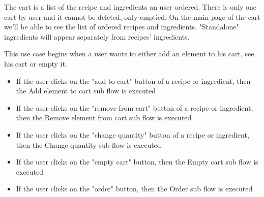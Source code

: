 {
  The cart is a list of the recipe and ingredients an user ordered. There is only one cart by user and it cannot be deleted, only emptied. On the main page of the cart we'll be able to see the list of ordered recipes and ingredients. "Standalone" ingredients will appear separately from recipes' ingredients.

}
{
  This use case begins when a user wants to either add an element to his cart, see his cart or empty it.

  \begin{itemize}
    \item If the user clicks on the "add to cart" button of a recipe or ingredient, then the Add element to cart sub flow is executed
    \item If the user clicks on the "remove from cart" button of a recipe or ingredient, then the Remove element from cart sub flow is executed
    \item If the user clicks on the "change quantity" button of a recipe or ingredient, then the Change quantity sub flow is executed
    \item If the user clicks on the "empty cart" button, then the Empty cart sub flow is executed
    \item If the user clicks on the "order" button, then the Order sub flow is executed
  \end{itemize}

}
